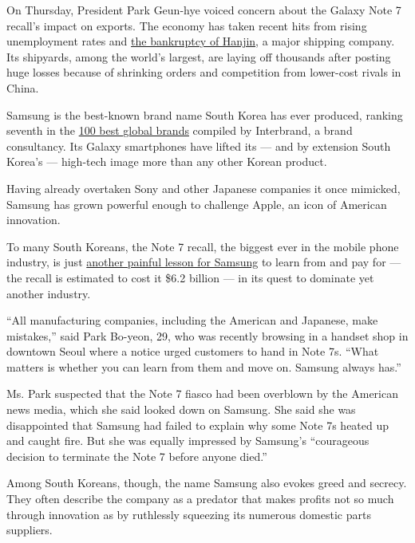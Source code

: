 On Thursday, President Park Geun-hye voiced concern about the Galaxy
Note 7 recall's impact on exports. The economy has taken recent hits
from rising unemployment rates and
\href{http://www.nytimes3xbfgragh.onion/2016/09/16/business/dealbook/lack-of-planning-hampers-hanjin-shipping-bankruptcy.html}{the
bankruptcy of Hanjin}, a major shipping company. Its shipyards, among
the world's largest, are laying off thousands after posting huge losses
because of shrinking orders and competition from lower-cost rivals in
China.

Samsung is the best-known brand name South Korea has ever produced,
ranking seventh in the
\href{http://interbrand.com/best-brands/best-global-brands/2016/ranking/}{100
best global brands} compiled by Interbrand, a brand consultancy. Its
Galaxy smartphones have lifted its --- and by extension South Korea's
--- high-tech image more than any other Korean product.

Having already overtaken Sony and other Japanese companies it once
mimicked, Samsung has grown powerful enough to challenge Apple, an icon
of American innovation.

To many South Koreans, the Note 7 recall, the biggest ever in the mobile
phone industry, is just
\href{http://www.nytimes3xbfgragh.onion/2016/10/13/business/international/samsung-galaxy-note7-profit-battery-fires.html}{another
painful lesson for Samsung} to learn from and pay for --- the recall is
estimated to cost it \$6.2 billion --- in its quest to dominate yet
another industry.

``All manufacturing companies, including the American and Japanese, make
mistakes,'' said Park Bo-yeon, 29, who was recently browsing in a
handset shop in downtown Seoul where a notice urged customers to hand in
Note 7s. ``What matters is whether you can learn from them and move on.
Samsung always has.''

Ms. Park suspected that the Note 7 fiasco had been overblown by the
American news media, which she said looked down on Samsung. She said she
was disappointed that Samsung had failed to explain why some Note 7s
heated up and caught fire. But she was equally impressed by Samsung's
``courageous decision to terminate the Note 7 before anyone died.''

Among South Koreans, though, the name Samsung also evokes greed and
secrecy. They often describe the company as a predator that makes
profits not so much through innovation as by ruthlessly squeezing its
numerous domestic parts suppliers.

